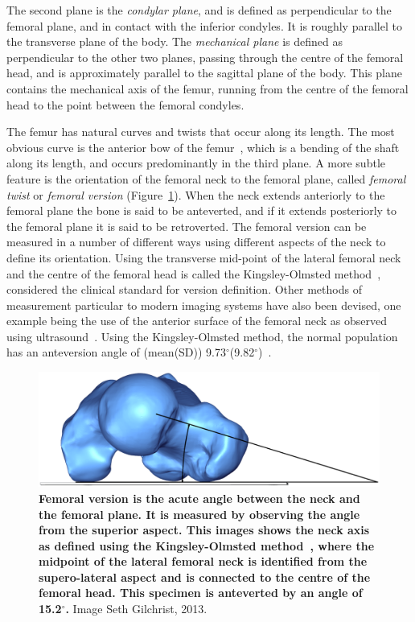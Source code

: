 The second plane is the \textit{condylar plane}, and is defined as perpendicular to the femoral plane, and in contact with the inferior condyles.
It is roughly parallel to the transverse plane of the body.
The \textit{mechanical plane} is defined as perpendicular to the other two planes, passing through the centre of the femoral head, and is approximately parallel to the sagittal plane of the body.
This plane contains the mechanical axis of the femur, running from the centre of the femoral head to the point between the femoral condyles.

The femur has natural curves and twists that occur along its length.
The most obvious curve is the anterior bow of the femur~\cite{gray_anatomy_1918}, which is a bending of the shaft along its length, and occurs predominantly in the third plane.
A more subtle feature is the orientation of the femoral neck to the femoral plane, called \textit{femoral twist} or \textit{femoral version} (Figure~\ref{fig:Version}).
When the neck extends anteriorly to the femoral plane the bone is said to be anteverted, and if it extends posteriorly to the femoral plane it is said to be retroverted.
The femoral version can be measured in a number of different ways using different aspects of the neck to define its orientation.
Using the transverse mid-point of the lateral femoral neck and the centre of the femoral head is called the Kingsley-Olmsted method~\citep{kingsley_study_1948}, considered the clinical standard for version definition.
Other methods of measurement particular to modern imaging systems have also been devised, one example being the use of the anterior surface of the femoral neck as observed using ultrasound~\citep{aamodt_femoral_1995}.
Using the Kingsley-Olmsted method, the normal population has an anteversion angle of (mean(SD)) 9.73$^\circ$(9.82$^\circ$)~\citep{toogood_proximal_2009}.

\begin{figure}
\includegraphics[width=\hsize]{./intro/Figures/Version}			
\caption[Femoral version]{\textbf{Femoral version is the acute angle between the neck and the femoral plane. It is measured by observing the angle from the superior aspect. This images shows the neck axis as defined using the Kingsley-Olmsted method~\cite{kingsley_study_1948}, where the midpoint of the lateral femoral neck is identified from the supero-lateral aspect and is connected to the centre of the femoral head. This specimen is anteverted by an angle of 15.2$^\circ$.} Image \textcopyright Seth Gilchrist, 2013.} 
\label{fig:Version}
\end{figure}

